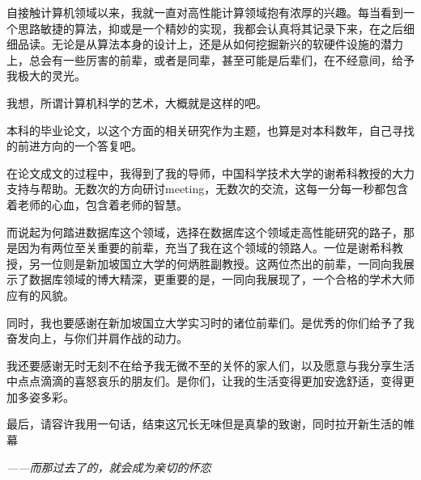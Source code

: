 \begin{acknowledgements}

自接触计算机领域以来，我就一直对高性能计算领域抱有浓厚的兴趣。每当看到一个思路敏捷的算法，抑或是一个精妙的实现，我都会认真将其记录下来，在之后细细品读。无论是从算法本身的设计上，还是从如何挖掘新兴的软硬件设施的潜力上，总会有一些厉害的前辈，或者是同辈，甚至可能是后辈们，在不经意间，给予我极大的灵光。

我想，所谓计算机科学的艺术，大概就是这样的吧。

本科的毕业论文，以这个方面的相关研究作为主题，也算是对本科数年，自己寻找的前进方向的一个答复吧。

在论文成文的过程中，我得到了我的导师，中国科学技术大学的谢希科教授的大力支持与帮助。无数次的方向研讨meeting，无数次的交流，这每一分每一秒都包含着老师的心血，包含着老师的智慧。

而说起为何踏进数据库这个领域，选择在数据库这个领域走高性能研究的路子，那是因为有两位至关重要的前辈，充当了我在这个领域的领路人。一位是谢希科教授，另一位则是新加坡国立大学的何炳胜副教授。这两位杰出的前辈，一同向我展示了数据库领域的博大精深，更重要的是，一同向我展现了，一个合格的学术大师应有的风貌。

同时，我也要感谢在新加坡国立大学实习时的诸位前辈们。是优秀的你们给予了我奋发向上，与你们并肩作战的动力。

我还要感谢无时无刻不在给予我无微不至的关怀的家人们，以及愿意与我分享生活中点点滴滴的喜怒哀乐的朋友们。是你们，让我的生活变得更加安逸舒适，变得更加多姿多彩。

最后，请容许我用一句话，结束这冗长无味但是真挚的致谢，同时拉开新生活的帷幕

\emph{——而那过去了的，就会成为亲切的怀恋}

\end{acknowledgements}
